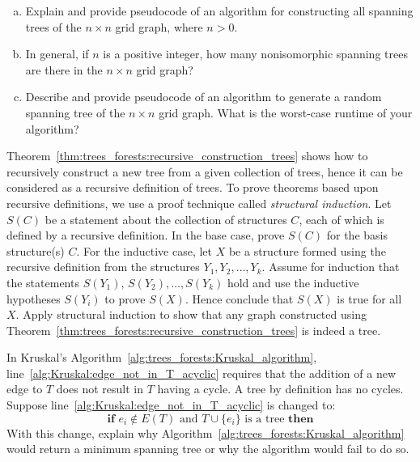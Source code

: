 \begin{problem}
\begin{enumerate}[(a)]
  \item Explain and provide pseudocode of an algorithm for
    constructing all spanning trees of the
    $n \times n$ grid graph, where $n > 0$.

  \item In general, if $n$ is a positive integer, how many
    nonisomorphic spanning trees are there in the $n \times n$ grid
    graph?

  \item Describe and provide pseudocode of an algorithm to generate a
    random spanning tree
    of the $n \times n$ grid graph. What is the worst-case runtime of
    your algorithm?
  \end{enumerate}

\item Theorem~\ref{thm:trees_forests:recursive_construction_trees}
  shows how to recursively construct a new tree from
  a given collection of trees, hence it can be considered as a
  recursive definition of trees. To
  prove theorems based upon recursive definitions, we use a proof
  technique called
  \emph{structural induction}. Let $S(C)$
  be a statement about the collection of structures $C$, each of which
  is defined by a recursive definition. In the base case, prove $S(C)$
  for the basis structure(s) $C$. For the inductive
  case, let $X$ be a structure formed using the recursive definition
  from the structures $Y_1, Y_2, \dots, Y_k$. Assume for induction
  that the statements $S(Y_1),\, S(Y_2), \dots, S(Y_k)$ hold and use
  the inductive hypotheses $S(Y_i)$ to prove $S(X)$. Hence conclude
  that $S(X)$ is true for all $X$. Apply structural induction to show
  that any graph constructed using
  Theorem~\ref{thm:trees_forests:recursive_construction_trees} is
  indeed a tree.

\item In Kruskal's
  Algorithm~\ref{alg:trees_forests:Kruskal_algorithm},
  line~\ref{alg:Kruskal:edge_not_in_T_acyclic} requires that the
  addition of a new edge to $T$ does not result in $T$ having a
  cycle. A tree by definition has no cycles. Suppose
  line~\ref{alg:Kruskal:edge_not_in_T_acyclic} is changed to:
  \[
  \textbf{if } e_i \notin E(T)
  \text{ and }
  T \cup \{e_i\} \text{ is a tree } \textbf{then}
  \]
  With this change, explain why
  Algorithm~\ref{alg:trees_forests:Kruskal_algorithm} would return a
  minimum spanning tree or why the algorithm would fail to do so.


\end{problem}
